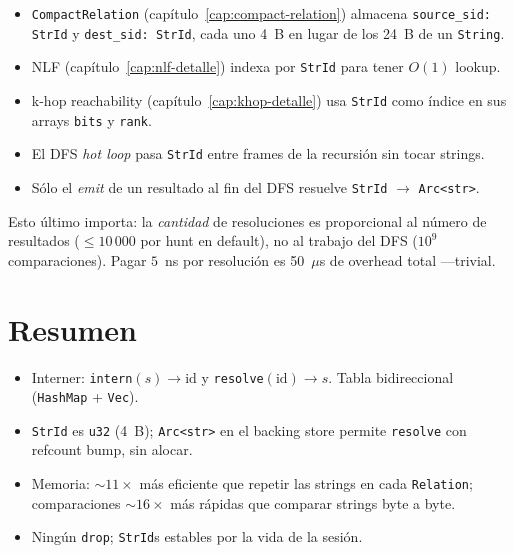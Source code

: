 \begin{itemize}
    \item \texttt{CompactRelation} (capítulo~\ref{cap:compact-relation})
    almacena \texttt{source\_sid: StrId} y \texttt{dest\_sid: StrId},
    cada uno 4~B en lugar de los 24~B de un \texttt{String}.
    \item NLF (capítulo~\ref{cap:nlf-detalle}) indexa por
    \texttt{StrId} para tener \(O(1)\) lookup.
    \item k-hop reachability (capítulo~\ref{cap:khop-detalle}) usa
    \texttt{StrId} como índice en sus arrays \texttt{bits} y
    \texttt{rank}.
    \item El DFS \emph{hot loop} pasa \texttt{StrId} entre frames de
    la recursión sin tocar strings.
    \item Sólo el \emph{emit} de un resultado al fin del DFS resuelve
    \texttt{StrId} $\rightarrow$ \texttt{Arc<str>}.
\end{itemize}

Esto último importa: la \emph{cantidad} de resoluciones es
proporcional al número de resultados (\(\leq 10\,000\) por hunt en
default), no al trabajo del DFS (\(10^9\) comparaciones). Pagar
\(5\)~ns por resolución es 50~$\mu$s de overhead total ---trivial.

\section{Resumen}

\begin{itemize}
    \item Interner: \texttt{intern}\((s) \to \mathrm{id}\) y
    \texttt{resolve}\((\mathrm{id}) \to s\). Tabla bidireccional
    (\texttt{HashMap} + \texttt{Vec}).
    \item \texttt{StrId} es \texttt{u32} (4~B); \texttt{Arc<str>}
    en el backing store permite \texttt{resolve} con refcount bump,
    sin alocar.
    \item Memoria: \(\sim 11\times\) más eficiente que repetir las
    strings en cada \texttt{Relation}; comparaciones \(\sim 16\times\)
    más rápidas que comparar strings byte a byte.
    \item Ningún \texttt{drop}; \texttt{StrId}s estables por la vida
    de la sesión.
\end{itemize}

